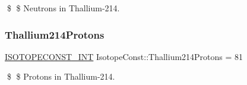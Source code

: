 \$ \$ Neutrons in Thallium-\/214. \mbox{\label{group___isotope_const-_thallium-_tl214_gaa71b14e0733fa946e3e21ad476ca70b6}} 
\subsubsection{\texorpdfstring{Thallium214\+Protons}{Thallium214Protons}}
{\footnotesize\ttfamily \mbox{\hyperlink{group___isotope_const-_macros_ga5f18360b3e99483a35c32d789e62621c}{I\+S\+O\+T\+O\+P\+E\+C\+O\+N\+S\+T\+\_\+\+I\+NT}} Isotope\+Const\+::\+Thallium214\+Protons = 81}

\$ \$ Protons in Thallium-\/214. 